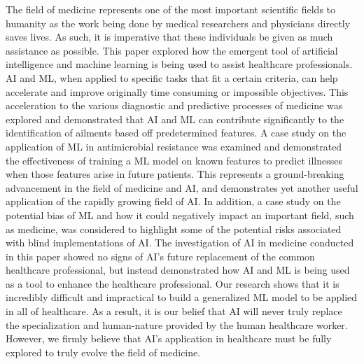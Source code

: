 \documentclass[a4paper]{article}
\begin{document}
The field of medicine represents one of the most important scientific fields to humanity as the work being done by medical researchers and physicians directly saves lives. As such, it is imperative that these individuals be given as much assistance as possible. This paper explored how the emergent tool of artificial intelligence and machine learning is being used to assist healthcare professionals. AI and ML, when applied to specific tasks that fit a certain criteria, can help accelerate and improve originally time consuming or impossible objectives. This acceleration to the various diagnostic and predictive processes of medicine was explored and demonstrated that AI and ML can contribute significantly to the identification of ailments based off predetermined features. A case study on the application of ML in antimicrobial resistance was examined and demonstrated the effectiveness of training a ML model on known features to predict illnesses when those features arise in future patients. This represents a ground-breaking advancement in the field of medicine and AI, and demonstrates yet another useful application of the rapidly growing field of AI. In addition, a case study on the potential bias of ML and how it could negatively impact an important field, such as medicine, was considered to highlight some of the potential risks associated with blind implementations of AI. The investigation of AI in medicine conducted in this paper showed no signs of AI's future replacement of the common healthcare professional, but instead demonstrated how AI and ML is being used as a tool to enhance the healthcare professional. Our research shows that it is incredibly difficult and impractical to build a generalized ML model to be applied in all of healthcare. As a result, it is our belief that AI will never truly replace the specialization and human-nature provided by the human healthcare worker. However, we firmly believe that AI's application in healthcare must be fully explored to truly evolve the field of medicine.  

\newpage



\end{document}
